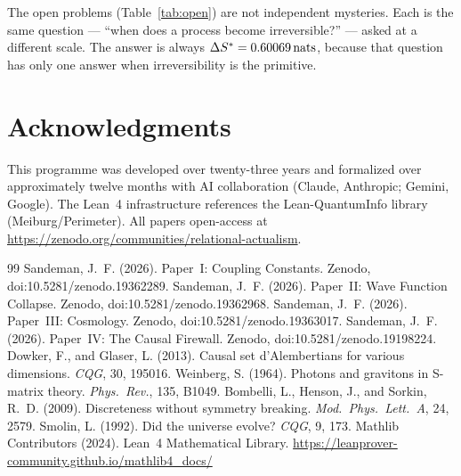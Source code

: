 \documentclass[12pt,a4paper]{article}
\begin{document}
The open problems (Table~\ref{tab:open}) are not independent mysteries.  Each is the same question --- ``when does a process become irreversible?'' --- asked at a different scale.  The answer is always $\Delta S^* = 0.60069\,\mathrm{nats}$, because that question has only one answer when irreversibility is the primitive.

\section*{Acknowledgments}
This programme was developed over twenty-three years and formalized over approximately twelve months with AI collaboration (Claude, Anthropic; Gemini, Google).  The Lean~4 infrastructure references the Lean-QuantumInfo library (Meiburg/Perimeter).  All papers open-access at \url{https://zenodo.org/communities/relational-actualism}.


\begin{thebibliography}{99}
 Sandeman, J.~F. (2026). Paper~I: Coupling Constants. Zenodo, doi:10.5281/zenodo.19362289.
 Sandeman, J.~F. (2026). Paper~II: Wave Function Collapse. Zenodo, doi:10.5281/zenodo.19362968.
 Sandeman, J.~F. (2026). Paper~III: Cosmology. Zenodo, doi:10.5281/zenodo.19363017.
 Sandeman, J.~F. (2026). Paper~IV: The Causal Firewall. Zenodo, doi:10.5281/zenodo.19198224.
 Dowker, F., and Glaser, L. (2013). Causal set d'Alembertians for various dimensions. \textit{CQG}, 30, 195016.
 Weinberg, S. (1964). Photons and gravitons in S-matrix theory. \textit{Phys.\ Rev.}, 135, B1049.
 Bombelli, L., Henson, J., and Sorkin, R.~D. (2009). Discreteness without symmetry breaking. \textit{Mod.\ Phys.\ Lett.\ A}, 24, 2579.
 Smolin, L. (1992). Did the universe evolve? \textit{CQG}, 9, 173.
 Mathlib Contributors (2024). Lean~4 Mathematical Library. \url{https://leanprover-community.github.io/mathlib4_docs/}
\end{thebibliography}
\end{document}
